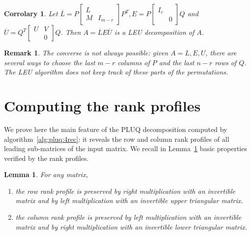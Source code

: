 \documentclass{article}
\newcommand{\strechparskip}[1]{}
\newcommand{\strechparsep}[1]{}
\newcommand{\customvspace}[1]{}
\newtheorem{lemma}{Lemma}
\newtheorem{corrolary}{Corrolary}
\newtheorem{remark}{Remark}
\begin{document}
\begin{corrolary}\label{cor:leu}
  Let $\overline{L} = P
  \begin{bmatrix}
    L\\M&I_{m-r}
  \end{bmatrix}P^T, 
E=P
\begin{bmatrix}
  I_r\\&0
\end{bmatrix}
Q$ and $\overline{U} = Q^T
  \begin{bmatrix}
    U&V\\&0
  \end{bmatrix}Q
  $.
Then $A=\overline{L}E\overline{U}$ is a LEU decomposition of $A$.
\end{corrolary}




\begin{remark}
The converse is not always possible: given $A=L,E,U$, there are
several ways to choose the last $m-r$ columns of $P$ and the last $n-r$ rows of
$Q$. The LEU algorithm does not keep track of these parts of
the permutations.
\end{remark}


 \section{Computing the rank profiles}
\label{sec:rp}

We prove here the main feature of the PLUQ decomposition computed by
algorithm~\ref{alg:pluq:4rec}: it reveals the row and column rank profiles of all leading
sub-matrices of the input matrix.
We recall in Lemma~\ref{lem:rankprofiletransf} basic properties verified by the
rank profiles.
\begin{lemma} For any matrix,
\label{lem:rankprofiletransf}
\begin{enumerate}\customvspace{-5pt}\strechparsep{-1pt}\strechparskip{0pt}
\item\label{point:rrp} the row rank profile is preserved by right multiplication
  with an invertible matrix and by left multiplication with an invertible upper
  triangular matrix.
\item\label{point:crp} the column rank profile is preserved by left multiplication with an
  invertible matrix and by right multiplication with an invertible lower
  triangular matrix.
\customvspace{-5pt}\end{enumerate}
\end{lemma}
\end{document}

